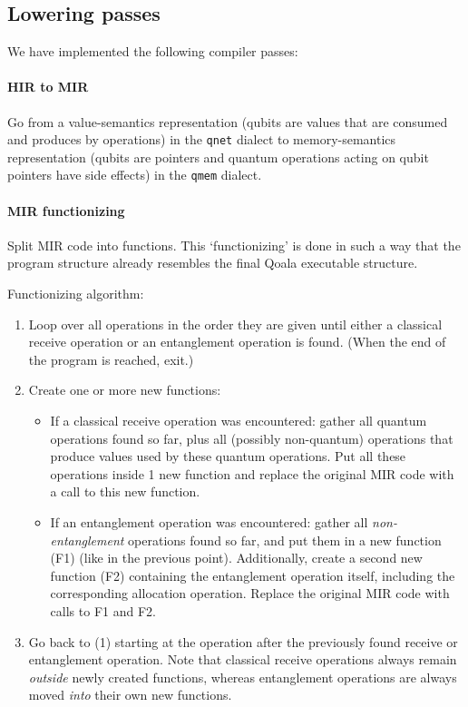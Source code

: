 \subsection{Lowering passes}
We have implemented the following compiler passes:

\paragraph{HIR to MIR}
Go from a value-semantics representation (qubits are values that are consumed and produces by operations) in the \texttt{qnet} dialect to memory-semantics representation (qubits are pointers and quantum operations acting on qubit pointers have side effects) in the \texttt{qmem} dialect.

\paragraph{MIR functionizing}
Split MIR code into functions.
This `functionizing' is done in such a way that the program structure already resembles the final Qoala executable structure.

Functionizing algorithm:
\begin{enumerate}
\item Loop over all operations in the order they are given until either a classical receive operation or an entanglement operation is found. (When the end of the program is reached, exit.)
\item Create one or more new functions:
    \begin{itemize}
        \item If a classical receive operation was encountered: gather all quantum operations found so far, plus all (possibly non-quantum) operations that produce values used by these quantum operations. Put all these operations inside 1 new function and replace the original MIR code with a call to this new function.
        \item If an entanglement operation was encountered: gather all \emph{non-entanglement} operations found so far, and put them in a new function (F1) (like in the previous point).
        Additionally, create a second new function (F2) containing the entanglement operation itself, including the corresponding allocation operation. Replace the original MIR code with calls to F1 and F2.
    \end{itemize}
\item Go back to (1) starting at the operation after the previously found receive or entanglement operation. Note that classical receive operations always remain \emph{outside} newly created functions, whereas entanglement operations are always moved \emph{into} their own new functions.
\end{enumerate}

